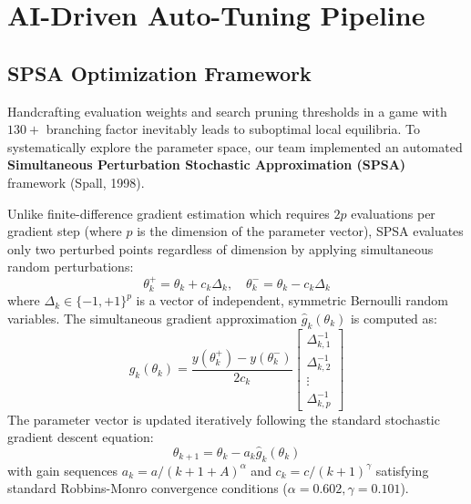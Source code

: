 \section{AI-Driven Auto-Tuning Pipeline}

\subsection{SPSA Optimization Framework}
Handcrafting evaluation weights and search pruning thresholds in a game with $130+$ branching factor inevitably leads to suboptimal local equilibria. To systematically explore the parameter space, our team implemented an automated \textbf{Simultaneous Perturbation Stochastic Approximation (SPSA)} framework (Spall, 1998).

Unlike finite-difference gradient estimation which requires $2p$ evaluations per gradient step (where $p$ is the dimension of the parameter vector), SPSA evaluates only two perturbed points regardless of dimension by applying simultaneous random perturbations:
\begin{equation}
    \theta_k^+ = \theta_k + c_k \Delta_k, \quad \theta_k^- = \theta_k - c_k \Delta_k
\end{equation}
where $\Delta_k \in \{-1, +1\}^p$ is a vector of independent, symmetric Bernoulli random variables. The simultaneous gradient approximation $\hat{g}_k(\theta_k)$ is computed as:
\begin{equation}
    \hat{g}_k(\theta_k) = \frac{y(\theta_k^+) - y(\theta_k^-)}{2 c_k} \begin{bmatrix} \Delta_{k,1}^{-1} \\ \Delta_{k,2}^{-1} \\ \vdots \\ \Delta_{k,p}^{-1} \end{bmatrix}
\end{equation}
The parameter vector is updated iteratively following the standard stochastic gradient descent equation:
\begin{equation}
    \theta_{k+1} = \theta_k - a_k \hat{g}_k(\theta_k)
\end{equation}
with gain sequences $a_k = a / (k + 1 + A)^\alpha$ and $c_k = c / (k + 1)^\gamma$ satisfying standard Robbins-Monro convergence conditions ($\alpha = 0.602, \gamma = 0.101$).

